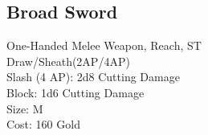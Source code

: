 \subsection{Broad Sword}\label{weapon:broadSword}
One-Handed Melee Weapon,  Reach, ST\\
Draw/Sheath(2AP/4AP)\\
Slash (4 AP): 2d8 Cutting Damage\\
Block: 1d6 Cutting Damage\\
Size: M\\
Cost: 160 Gold\\